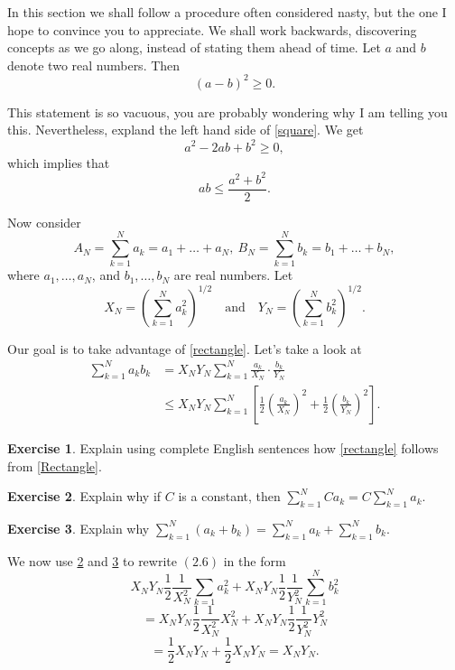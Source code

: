 \documentclass[]{stml-l}
\numberwithin{equation}{chapter}
\theoremstyle{plain}
\theoremstyle{definition}
\newtheorem{exercise}{Exercise}[chapter]
\theoremstyle{remark}
\begin{document}
In this section we shall follow a procedure often considered nasty, but
the one I hope to convince you to appreciate. We shall work backwards,
discovering concepts as we go along, instead of stating them ahead of
time. Let $a$ and $b$ denote two real numbers. Then
\begin{equation} \label{square}
 {(a-b)}^2 \ge 0. \end{equation}

This statement is so vacuous, you are probably wondering why I am telling
you this. Nevertheless, expland the left hand side of \ref{square}. We get
\[ 
a^2-2ab+b^2 \ge 0, 
\]
 which implies that
\begin{equation} \label{rectangle} 
ab \leq \frac{a^2+b^2}{2}. 
\end{equation}

Now consider
\[ 
A_N=\sum_{k=1}^N a_k=a_1+\dots+a_N, \ B_N=\sum_{k=1}^N
b_k=b_1+\dots+b_N, 
\] 
where
$a_1, \dots, a_N$, and $b_1, \dots, b_N$ are real numbers. Let
\[ 
X_N={\left(\sum_{k=1}^N a_k^2 \right)}^{1/2} \quad \text{and} \quad
Y_N={\left(\sum_{k=1}^N b_k^2 \right)}^{1/2}. 
\]

Our goal is to take advantage of \ref{rectangle}. Let's take a look at
\begin{equation} \label{Rectangle}
\begin{split}
\sum_{k=1}^N a_k b_k &=X_N Y_N \sum_{k=1}^N \frac{a_k}{X_N} \cdot
\frac{b_k}{Y_N}\\
&\leq X_NY_N \sum_{k=1}^N
\left[\frac{1}{2}{\left(\frac{a_k}{X_N}\right)}^2+
\frac{1}{2}{\left(\frac{b_k}{Y_N}\right)}^2\right].
\end{split}
\end{equation}

\begin{exercise} Explain using complete English sentences how \ref{rectangle} follows from \ref{Rectangle}. \end{exercise} 

\begin{exercise} \label{prelim2} Explain why if $C$ is a constant, then $\sum_{k=1}^N Ca_k=C\sum_{k=1}^N a_k$. \end{exercise}

\begin{exercise} \label{prelim3} Explain why $\sum_{k=1}^N (a_k+b_k)=\sum_{k=1}^N a_k+\sum_{k=1}^N b_k$. \end{exercise}

We now use \ref{prelim2} and \ref{prelim3} to rewrite $(2.6)$ in the form
\[ X_NY_N \frac{1}{2} \frac{1}{X^2_N} \sum_{k=1} a_k^2+X_NY_N
\frac{1}{2} \frac{1}{Y^2_N}\sum_{k=1}^N b_k^2\]
\[=X_NY_N \frac{1}{2} \frac{1}{X^2_N} X_N^2+X_NY_N
\frac{1}{2} \frac{1}{Y^2_N}Y_N^2\]
\[=\frac{1}{2}X_NY_N+\frac{1}{2}X_NY_N=X_NY_N. \]
\end{document}
